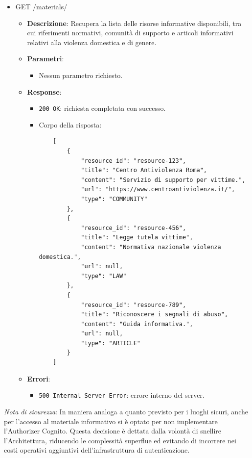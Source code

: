 \documentclass[a4paper,12pt]{article}
\makeatletter
\newcommand\subsubsubsection{\@startsection{paragraph}{4}{\z@}{-2.5ex\@plus -1ex \@minus -.25ex}{1.25ex \@plus .25ex}{\normalfont\normalsize\bfseries}}
\newcommand{\code}[1]{{\ttfamily\textcolor{purple!85!black}{#1}}}
\makeatother
\begin{document}
\subsubsubsection{API associate}
\begin{itemize}
    \item \code{GET /materials/}
    \begin{itemize}
        \item \textbf{Descrizione}: Recupera la lista delle risorse informative disponibili, tra cui riferimenti normativi, comunità di supporto e articoli informativi relativi alla violenza domestica e di genere.
        
        \item \textbf{Parametri}:
        \begin{itemize}
            \item Nessun parametro richiesto.
        \end{itemize}
        
        \item \textbf{Response}:
        \begin{itemize}
            \item \texttt{200 OK}: richiesta completata con successo.
            \item Corpo della risposta:
\begin{verbatim}
    [
        {
            "resource_id": "resource-123",
            "title": "Centro Antiviolenza Roma",
            "content": "Servizio di supporto per vittime.",
            "url": "https://www.centroantiviolenza.it/",
            "type": "COMMUNITY"
        },
        {
            "resource_id": "resource-456",
            "title": "Legge tutela vittime",
            "content": "Normativa nazionale violenza domestica.",
            "url": null,
            "type": "LAW"
        },
        {
            "resource_id": "resource-789",
            "title": "Riconoscere i segnali di abuso",
            "content": "Guida informativa.",
            "url": null,
            "type": "ARTICLE"
        }
    ]
    \end{verbatim}
        \end{itemize}
        
        \item \textbf{Errori}:
        \begin{itemize}
            \item \texttt{500 Internal Server Error}: errore interno del server.
        \end{itemize}
    \end{itemize}
\end{itemize}
\textit{Nota di sicurezza}: In maniera analoga a quanto previsto per i luoghi sicuri, anche per l'accesso al materiale informativo si è optato per non implementare l'Authorizer Cognito. Questa decisione è dettata dalla volontà di snellire l'Architettura, riducendo le complessità superflue ed evitando di incorrere nei costi operativi aggiuntivi dell'infrastruttura di autenticazione.
\end{document}
